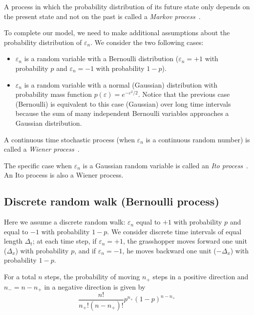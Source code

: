 \documentclass[justified,sixbynine]{tufte-book}
\theoremstyle{plain}%
\theoremstyle{definition}
\theoremstyle{remark}
\begin{document}
\begin{fullwidth}
A process in which the probability distribution of its future state only
depends on the present state and not on the past is called a
{\it Markov process}~\cite{markov}.

To complete our model, we need to make additional assumptions about the
probability distribution of $\varepsilon _n$. We consider the two following cases:

\begin{itemize}
\item  $\varepsilon _n$ is a random variable with a Bernoulli distribution ($%
\varepsilon _n=+1$ with probability $p$ and $\varepsilon _n=-1$ with
probability $1-p$).

\item  $\varepsilon _n$ is a random variable with a normal (Gaussian)
distribution with probability mass function $p(\varepsilon
)=e^{-\varepsilon ^2/2}$. Notice that the previous case (Bernoulli) is equivalent to this case (Gaussian) over long time intervals because the sum of many independent Bernoulli variables approaches a Gaussian distribution.
\end{itemize}

A continuous time stochastic process (when
$\varepsilon _n$ is a continuous random number)
is called a {\it Wiener process}~\cite{wiener}.

The specific case when $\varepsilon _n$ is a Gaussian random variable is called an {\it Ito process}~\cite{ito}. An Ito process is also a Wiener process.

\goodbreak\subsection{Discrete random walk (Bernoulli process)}

Here we assume a discrete  random walk: $\varepsilon _n$ equal to
$+1$ with probability $p$ and equal to $-1$ with probability $1-p.$ We
consider discrete time intervals of equal length $\Delta _t$; at each time
step, if $\varepsilon _n=+1$, the grasshopper moves forward one unit ($\Delta _x$)
with probability $p$, and if $\varepsilon _n=-1$, he moves backward one
unit ($-\Delta _x$) with probability $1-p$.

For a total $n$ steps, the probability of moving $n_{+}$ steps in a positive
direction and $n_{-}=n-n_{+}$ in a negative direction is given by
\begin{equation}
\frac{n!}{n_{+}!(n-n_{+})!}p^{n_{+}}(1-p)^{n-n_{+}}
\end{equation}


\end{fullwidth}
\end{document}
